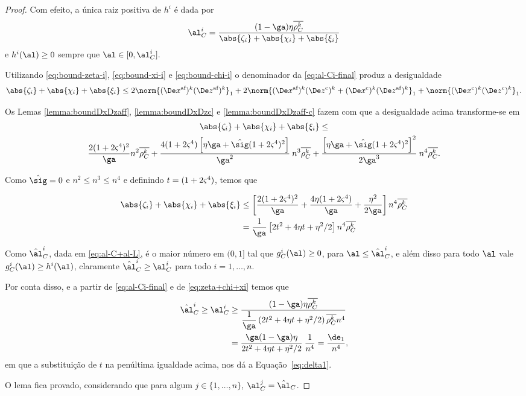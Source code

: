 \begin{proof}
Com efeito, a única raiz positiva de $h^i$ é dada por
\begin{equation}
	\label{eq:al-Ci-final}
	\al_{C}^i = \dfrac{(1-\ga)\eta\rhoCkb }{\abs{\zeta_i} + \abs{\chi_i} + \abs{\xi_i}}
\end{equation}
e $h^i(\al)\geq 0$ sempre que $\al\in[0,\al_{C}^i].$ 



Utilizando \eqref{eq:bound-zeta-i}, \eqref{eq:bound-xi-i} e \eqref{eq:bound-chi-i} o denominador da \eqref{eq:al-Ci-final} produz a desigualdade
\[
\abs{\zeta_i} + \abs{\chi_i} + \abs{\xi_i} \leq 2\norm{ \dekx  \dekz }_1 + 2 \norm{ \dekx \Dekcoz + \Dekcox \dekz }_1 + \norm{\Dekcox\Dekcoz}_1.
\]



Os Lemas \ref{lemma:boundDxDzaff},   \ref{lemma:boundDxDzc} e \ref{lemma:boundDxDzaff-c}  fazem com que a desigualdade acima transforme-se em 
\begin{multline*}
\abs{\zeta_i} + \abs{\chi_i} + \abs{\xi_i}  \leq \\  \frac{2(1 + 2\bdxzstar^{4})^{2} }{\ga} n^{2}\rhoCkb + 
												\dfrac{4(1+2\bdxzstar^{4})\left[\eta\ga + \nextsig(1+2\bdxzstar^{4})^{2}\right]}{\ga^{2}}\: n^{3}\rhoCkb + 	 \dfrac{\left[\eta\ga + \nextsig(1+2\bdxzstar^{4})^{2}\right]^{2}}{2\ga^{3}} \: n^{4}\rhoCkb.
\end{multline*}

Como $\nextsig = 0$ e $n^{2}\leq n^{3}\leq  n^{4}$ e definindo $t = (1 + 2\varsigma^{4})$, temos que 

	\begin{align}
	\abs{\zeta_i} + \abs{\chi_i} + \abs{\xi_i} & \leq \left[ \frac{2(1 + 2\bdxzstar^{4})^{2} }{\ga} + 												\dfrac{4\eta(1+2\bdxzstar^{4})}{\ga} +	 \dfrac{\eta^{2}}{2\ga} \right] n^{4}\rhoCkb \notag \\
										& =	\dfrac{1}{\ga}\left[ 2t^{2} + 4\eta t + \eta^{2}/2 \right] n^{4}\rhoCkb
										\label{eq:zeta+chi+xi}
	\end{align}

Como $\nextal^{i}_{C}$, dada em \eqref{eq:al-C+al-L}, é o maior número em $(0,1]$ tal que $g_{C}^{i}(\al)\geq 0$, para $\al\leq\nextal^{i}_{C}$, e além disso para todo $\al$ vale $g_{C}^{i}(\al) \geq h^{i}(\al)$, claramente $\nextal^{i}_{C} \geq  \al_{C}^i$ para todo $i=1,\ldots,n$.


Por conta disso, e a partir  de \eqref{eq:al-Ci-final} e de \eqref{eq:zeta+chi+xi} temos que 
\[
\begin{aligned}
\nextal_{C}^i \geq \al_{C}^{i} & \geq \dfrac{(1-\ga)\eta\rhoCkb}{\dfrac{1}{\ga}\left( 2t^{2} + 4\eta t + \eta^{2}/2 \right)\rhoCkb n^{4} } \\			 
							& = \dfrac{\ga(1-\ga)\eta}{ 2t^{2} + 4\eta t + \eta^{2}/2 } \:\dfrac{1}{n^{4}} = \dfrac{\de_{1}}{n^{4}},
\end{aligned}
\]
em que a substituição de $t$ na penúltima igualdade acima, nos dá a Equação~\eqref{eq:delta1}.

 O lema fica provado, considerando que para algum $j\in\{1,\ldots,n\}$, $ \al_{C}^{j}=\nextal_{C} $.
 \end{proof}






